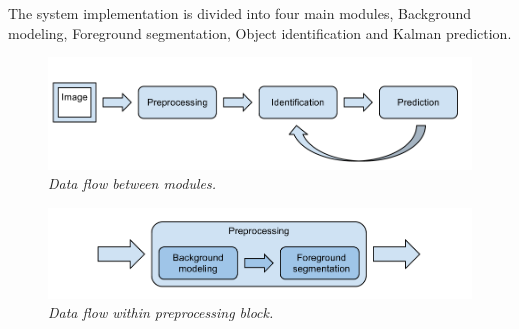 The system implementation is divided into four main modules, Background modeling, Foreground segmentation, Object identification and Kalman prediction. 

\begin{figure}[htb]
	\centering
	\includegraphics[width=\linewidth]{images/data_flow.png}
	\caption{\textit{Data flow between modules.}}
	\label{fig:block_overview_fig}  %
\end{figure}

\begin{figure}[htb]
	\centering
	\includegraphics[width=\linewidth]{images/data_flow_preprocessing.png}
	\caption{\textit{Data flow within preprocessing block.}}
	\label{fig:block_overview2_fig}  %
\end{figure}

